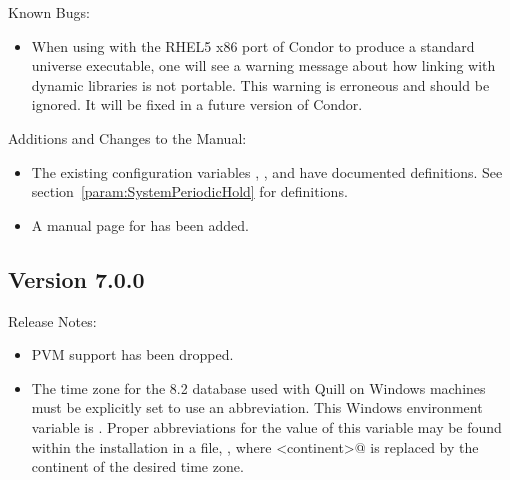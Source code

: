 \noindent Known Bugs:

\begin{itemize}

\item When using  with the RHEL5 x86 port of Condor to
produce a standard universe executable, one will see a warning message
about how linking with dynamic libraries is not portable. This warning
is erroneous and should be ignored. It will be fixed in a future version
of Condor.

\end{itemize}

\noindent Additions and Changes to the Manual:

\begin{itemize}

\item The existing configuration variables 
, , and
 have documented definitions.
See section~\ref{param:SystemPeriodicHold} for definitions.

\item A manual page for  has been added.

\end{itemize}


\subsection*{\label{sec:New-7-0-0}Version 7.0.0}

\noindent Release Notes:

\begin{itemize}

\item PVM support has been dropped.

\item The time zone for the  8.2 database
  used with Quill on Windows machines must be explicitly set
  to use an abbreviation.
  This Windows environment variable is \verb@TZ@.
  Proper abbreviations for the value of this variable may be found
  within the  installation in a file,
  , where
  \verb@<continent>@ is replaced by the continent of the 
  desired time zone.

\end{itemize}


